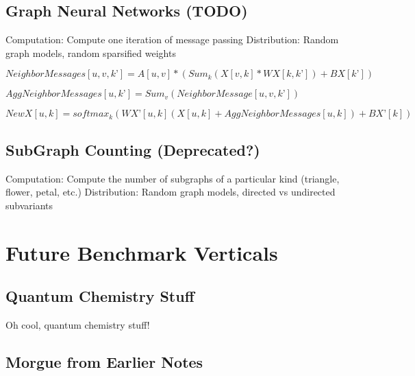 \documentclass{article}
\begin{document}
\subsection{Graph Neural Networks (TODO)}
	Computation: Compute one iteration of message passing
	Distribution: Random graph models, random sparsified weights

$NeighborMessages[u, v, k’] = A[u, v]*(Sum_k(X[v, k]*WX[k, k’]) +BX[k’])  $

$AggNeighborMessages[u, k’] = Sum_v(NeighborMessage[u, v, k’])$

$NewX[u, k] = softmax_k(WX’[u,k](X[u, k] +AggNeighborMessages[u,k]) + BX’[k]) $

\subsection{SubGraph Counting (Deprecated?)}
	Computation: Compute the number of subgraphs of a particular kind (triangle, flower, petal, etc.)
	Distribution: Random graph models, directed vs undirected subvariants

\section{Future Benchmark Verticals}

\subsection{Quantum Chemistry Stuff}
Oh cool, quantum chemistry stuff!

\subsection{Morgue from Earlier Notes}
\end{document}

